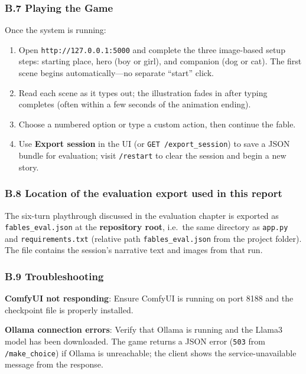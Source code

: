 \documentclass[12pt,a4paper]{article}
\begin{document}
\subsubsection*{B.7 Playing the Game}

    Once the system is running:

    \begin{enumerate}
    \item Open \texttt{http://127.0.0.1:5000} and complete the three image-based setup steps: starting place, hero (boy or girl), and companion (dog or cat). The first scene begins automatically---no separate ``start'' click.
    \item Read each scene as it types out; the illustration fades in after typing completes (often within a few seconds of the animation ending).
    \item Choose a numbered option or type a custom action, then continue the fable.
    \item Use \textbf{Export session} in the UI (or \texttt{GET /export\_session}) to save a JSON bundle for evaluation; visit \texttt{/restart} to clear the session and begin a new story.
    \end{enumerate}

\subsubsection*{B.8 Location of the evaluation export used in this report}

The six-turn playthrough discussed in the evaluation chapter is exported as \texttt{fables\_eval.json} at the \textbf{repository root}, i.e.\ the same directory as \texttt{app.py} and \texttt{requirements.txt} (relative path \texttt{fables\_eval.json} from the project folder). The file contains the session's narrative text and images from that run.

\subsubsection*{B.9 Troubleshooting}

    \textbf{ComfyUI not responding}: Ensure ComfyUI is running on port 8188 and the checkpoint file is properly installed.

\textbf{Ollama connection errors}: Verify that Ollama is running and the Llama3 model has been downloaded. The game returns a JSON error (\texttt{503} from \texttt{/make\_choice}) if Ollama is unreachable; the client shows the service-unavailable message from the response.
\end{document}
